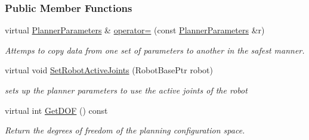 \subsubsection*{Public Member Functions}
\begin{DoxyCompactItemize}
\item 
virtual \hyperlink{classOpenRAVE_1_1PlannerBase_1_1PlannerParameters}{PlannerParameters} \& \hyperlink{classOpenRAVE_1_1PlannerBase_1_1PlannerParameters_a98b727075503cffbc2c40ddfd51a8890}{operator=} (const \hyperlink{classOpenRAVE_1_1PlannerBase_1_1PlannerParameters}{PlannerParameters} \&r)
\begin{DoxyCompactList}\small\item\em Attemps to copy data from one set of parameters to another in the safest manner. \item\end{DoxyCompactList}\item 
\hypertarget{classOpenRAVE_1_1PlannerBase_1_1PlannerParameters_a209ca0bfbbc31be9ecee12ce308374c4}{
virtual void \hyperlink{classOpenRAVE_1_1PlannerBase_1_1PlannerParameters_a209ca0bfbbc31be9ecee12ce308374c4}{SetRobotActiveJoints} (RobotBasePtr robot)}
\label{classOpenRAVE_1_1PlannerBase_1_1PlannerParameters_a209ca0bfbbc31be9ecee12ce308374c4}

\begin{DoxyCompactList}\small\item\em sets up the planner parameters to use the active joints of the robot \item\end{DoxyCompactList}\item 
\hypertarget{classOpenRAVE_1_1PlannerBase_1_1PlannerParameters_a44fbec2fd26a45cada889c5c0f0751c8}{
virtual int \hyperlink{classOpenRAVE_1_1PlannerBase_1_1PlannerParameters_a44fbec2fd26a45cada889c5c0f0751c8}{GetDOF} () const }
\label{classOpenRAVE_1_1PlannerBase_1_1PlannerParameters_a44fbec2fd26a45cada889c5c0f0751c8}

\begin{DoxyCompactList}\small\item\em Return the degrees of freedom of the planning configuration space. \item\end{DoxyCompactList}\end{DoxyCompactItemize}
